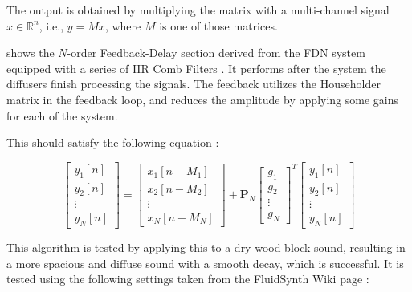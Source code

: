The output is obtained by multiplying the matrix with a multi-channel signal $x \in \mathbb{R}^n$, i.e., $y = Mx$, where
$M$ is one of those matrices.

 shows the $N$-order Feedback-Delay section derived from the FDN system equipped with a series
of IIR Comb Filters \cite{smith2010pasp}. It performs after the system the diffusers finish processing the signals. The feedback utilizes the Householder
matrix in the feedback loop, and reduces the amplitude by applying some gains for each of the system.



This should satisfy the following equation \cite{smith2010pasp}:

\begin{equation}\label{eq:feedback-loop}
    \begin{bmatrix}
        y_1[n] \\ y_2[n] \\ \vdots \\ y_N[n]
    \end{bmatrix}
    = 
    \begin{bmatrix}
        x_1[n - M_1] \\
        x_2[n - M_2] \\
        \vdots \\
        x_N[n - M_N]
    \end{bmatrix}
    + \mathbf{P}_N
    \begin{bmatrix}
        g_1 \\ g_2 \\ \vdots \\ g_N
    \end{bmatrix}^T
    \begin{bmatrix}
        y_1[n] \\ y_2[n] \\ \vdots \\ y_N[n]
    \end{bmatrix}
\end{equation}

This algorithm is tested by applying this to a dry wood block sound, resulting in a more spacious and diffuse sound with a smooth decay,
which is successful. It is tested using the following settings taken from the FluidSynth Wiki page \cite{fluidsynth_reverb_overview}:

